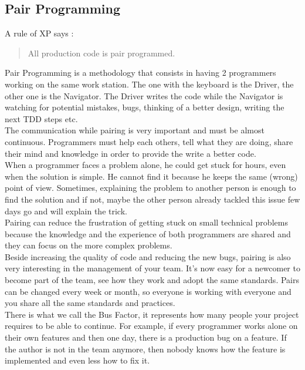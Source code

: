 \subsection{Pair Programming}\label{subsec:pair-programming}
A rule of XP says :
\begin{quotation}
    All production code is pair programmed.
\end{quotation}
Pair Programming is a methodology that consists in having 2 programmers
working on the same work station.
The one with the keyboard is the Driver, the other one is the Navigator.
The Driver writes the code while the Navigator is watching for potential
mistakes, bugs, thinking of a better design, writing the next TDD steps
etc. \\
\newline
The communication while pairing is very important and must be almost
continuous.
Programmers must help each others, tell what they are doing, share their
mind and knowledge in order to provide the write a better code. \\
When a programmer faces a problem alone, he could get stuck for hours,
even when the solution is simple.
He cannot find it because he keeps the same (wrong) point of view.
Sometimes, explaining the problem to another person is enough to find
the solution and if not, maybe the other person already tackled this
issue few days go and will explain the trick. \\
Pairing can reduce the frustration of getting stuck on small technical
problems because the knowledge and the experience of both programmers
are shared and they can focus on the more complex problems. \\
\newline
Beside increasing the quality of code and reducing the new bugs, pairing
is also very interesting in the management of your team.
It's now easy for a newcomer to become part of the team, see how they
work and adopt the same standards.
Pairs can be changed every week or month, so everyone is working with
everyone and you share all the same standards and practices. \\
There is what we call the Bus Factor, it represents how many people your
project requires to be able to continue.
For example, if every programmer works alone on their own features and
then one day, there is a production bug on a feature.
If the author is not in the team anymore, then nobody knows how the
feature is implemented and even less how to fix it. \\
